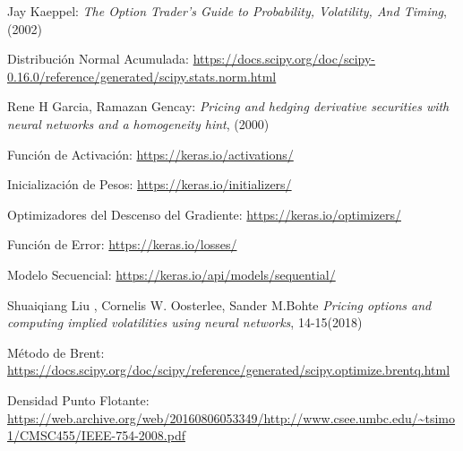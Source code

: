 \documentclass[a4paper,openright, 12pt, oneside]{book}
\begin{document}
\begin{thebibliography}{X}
  Jay Kaeppel:
  \emph{The Option Trader’s Guide to Probability, Volatility, And Timing},
  (2002)

  Distribución Normal Acumulada:
  \url{https://docs.scipy.org/doc/scipy-0.16.0/reference/generated/scipy.stats.norm.html}

  Rene H Garcia, Ramazan Gencay:
  \emph{Pricing and hedging derivative securities with neural networks and a homogeneity hint},
  (2000)

  Función de Activación:
  \url{https://keras.io/activations/}

  Inicialización de Pesos:
  \url{https://keras.io/initializers/}

  Optimizadores del Descenso del Gradiente:
  \url{https://keras.io/optimizers/}

  Función de Error:
  \url{https://keras.io/losses/}

  Modelo Secuencial:
  \url{https://keras.io/api/models/sequential/}

  Shuaiqiang Liu , Cornelis W. Oosterlee, Sander M.Bohte
  \emph{Pricing options and computing implied volatilities using neural networks},
  14-15(2018)

  Método de Brent:
  \url{https://docs.scipy.org/doc/scipy/reference/generated/scipy.optimize.brentq.html}
  
  Densidad Punto Flotante:
  \url{https://web.archive.org/web/20160806053349/http://www.csee.umbc.edu/~tsimo1/CMSC455/IEEE-754-2008.pdf}

\end{thebibliography}



%
%

\end{document}
